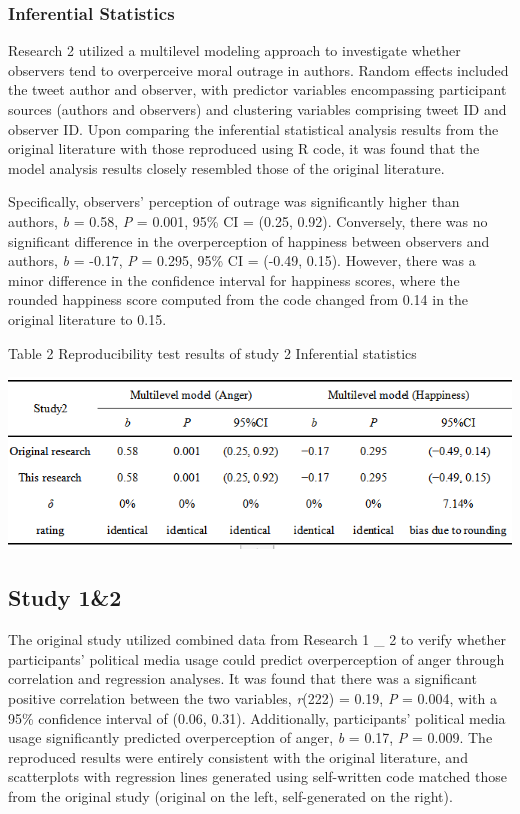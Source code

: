 \documentclass[
  man]{apa6}
\begin{document}
\hypertarget{inferential-statistics-1}{%
\subsubsection{Inferential Statistics}\label{inferential-statistics-1}}

Research 2 utilized a multilevel modeling approach to investigate whether observers tend to overperceive moral outrage in authors. Random effects included the tweet author and observer, with predictor variables encompassing participant sources (authors and observers) and clustering variables comprising tweet ID and observer ID. Upon comparing the inferential statistical analysis results from the original literature with those reproduced using R code, it was found that the model analysis results closely resembled those of the original literature.

Specifically, observers' perception of outrage was significantly higher than authors, \emph{b} = 0.58, \emph{P} = 0.001, 95\% CI = (0.25, 0.92). Conversely, there was no significant difference in the overperception of happiness between observers and authors, \emph{b} = -0.17, \emph{P} = 0.295, 95\% CI = (-0.49, 0.15). However, there was a minor difference in the confidence interval for happiness scores, where the rounded happiness score computed from the code changed from 0.14 in the original literature to 0.15.

\begin{center}
Table 2 Reproducibility test results of study 2 Inferential statistics
\end{center}
\begin{center}
\includegraphics{study2_Reproducibility_Plot.png}
\end{center}

\hypertarget{study-12}{%
\subsection{Study 1\&2}\label{study-12}}

The original study utilized combined data from Research 1 \_ 2 to verify whether participants' political media usage could predict overperception of anger through correlation and regression analyses. It was found that there was a significant positive correlation between the two variables, \emph{r}(222) = 0.19, \emph{P} = 0.004, with a 95\% confidence interval of (0.06, 0.31). Additionally, participants' political media usage significantly predicted overperception of anger, \emph{b} = 0.17, \emph{P} = 0.009. The reproduced results were entirely consistent with the original literature, and scatterplots with regression lines generated using self-written code matched those from the original study (original on the left, self-generated on the right).
\end{document}
